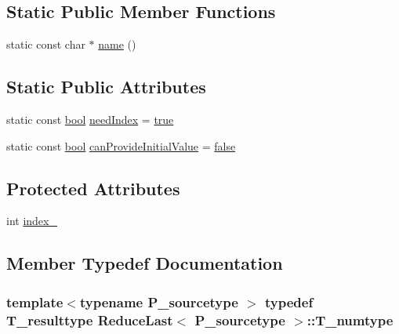\subsection*{Static Public Member Functions}
\begin{DoxyCompactItemize}
\item 
static const char $\ast$ \hyperlink{classReduceLast_a356d34f1de0675753c976729f98e5ab7}{name} ()
\end{DoxyCompactItemize}
\subsection*{Static Public Attributes}
\begin{DoxyCompactItemize}
\item 
static const \hyperlink{compiler_8h_abb452686968e48b67397da5f97445f5b}{bool} \hyperlink{classReduceLast_acb74691ed54238b159e787f230abda16}{need\+Index} = \hyperlink{compiler_8h_a41f9c5fb8b08eb5dc3edce4dcb37fee7}{true}
\item 
static const \hyperlink{compiler_8h_abb452686968e48b67397da5f97445f5b}{bool} \hyperlink{classReduceLast_a928dc9a31d650756f02af09fc83b6189}{can\+Provide\+Initial\+Value} = \hyperlink{compiler_8h_a65e9886d74aaee76545e83dd09011727}{false}
\end{DoxyCompactItemize}
\subsection*{Protected Attributes}
\begin{DoxyCompactItemize}
\item 
int \hyperlink{classReduceLast_a3e6043bceb1cee5afc7a48b874139018}{index\+\_\+}
\end{DoxyCompactItemize}


\subsection{Member Typedef Documentation}
\hypertarget{classReduceLast_adf839b2684ce133fbf40e7e07f0e0708}{}
\subsubsection[{T\+\_\+numtype}]{\setlength{\rightskip}{0pt plus 5cm}template$<$typename P\+\_\+sourcetype $>$ typedef {\bf T\+\_\+resulttype} {\bf Reduce\+Last}$<$ P\+\_\+sourcetype $>$\+::{\bf T\+\_\+numtype}}\label{classReduceLast_adf839b2684ce133fbf40e7e07f0e0708}
\hypertarget{classReduceLast_a173360092022caa3c428ac7bdca8c9dd}{}
